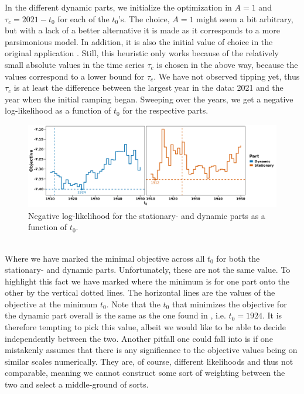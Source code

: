 In the different dynamic parts, we initialize the optimization in $A = 1$ and $\tau_c = 2021 - t_0$ for each of the $t_0$'s. The choice, $A = 1$ might seem a bit arbitrary, but with a lack of a better alternative it is made as it corresponds to a more parsimonious model. In addition, it is also the initial value of choice in the original application \cite{Ditlevsen2023}. Still, this heuristic only works because of the relatively small absolute values in the time series $\tau_c$ is chosen in the above way, because the values correspond to a lower bound for $\tau_c$. We have not observed tipping yet, thus $\tau_c$ is at least the difference between the largest year in the data: 2021 and the year when the initial ramping began. Sweeping over the years, we get a negative log-likelihood as a function of $t_0$ for the respective parts.
\begin{figure}[h!]
    \begin{center}
    \includegraphics[scale = .095]{figures/ramping_year_likelihood_plot.jpeg}
    \caption{Negative log-likelihood for the stationary- and dynamic parts as a function of $t_0$.}
    \label{figure:negLoglikRamping}        
    \end{center}
\end{figure}\\
Where we have marked the minimal objective across all $t_0$ for both the stationary- and dynamic parts. Unfortunately, these are not the same value. To highlight this fact we have marked where the minimum is for one part onto the other by the vertical dotted lines. The horizontal lines are the values of the objective at the minimum $t_0$. Note that the $t_0$ that minimizes the objective for the dynamic part overall is the same as the one found in \cite{Ditlevsen2023}, i.e. $t_0 = 1924$. It is therefore tempting to pick this value, albeit we would like to be able to decide independently between the two. Another pitfall one could fall into is if one mistakenly assumes that there is any significance to the objective values being on similar scales numerically. They are, of course, different likelihoods and thus not comparable, meaning we cannot construct some sort of weighting between the two and select a middle-ground of sorts.\\\\
